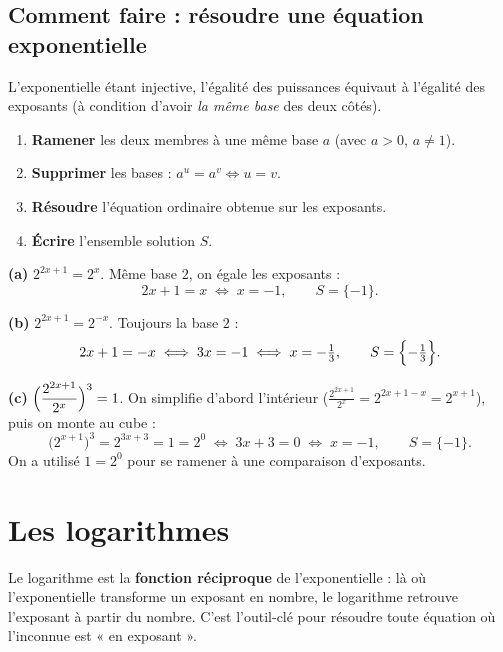 \documentclass[11pt,a4paper]{article}
\begin{document}
\subsection{Comment faire : résoudre une équation exponentielle}

\begin{commentfaire}[équation du type $a^{u(x)}=a^{v(x)}$]
L'exponentielle étant injective, l'égalité des puissances équivaut à l'égalité des exposants
(à condition d'avoir \emph{la même base} des deux côtés).
\begin{enumerate}[leftmargin=2em,topsep=2pt,itemsep=2pt]
  \item \textbf{Ramener} les deux membres à une même base $a$ (avec $a>0$, $a\neq 1$).
  \item \textbf{Supprimer} les bases : $a^{u}=a^{v}\Longleftrightarrow u=v$.
  \item \textbf{Résoudre} l'équation ordinaire obtenue sur les exposants.
  \item \textbf{Écrire} l'ensemble solution $S$.
\end{enumerate}
\end{commentfaire}

\begin{exemple}
\textbf{(a)} \;$2^{2x+1}=2^{x}$. Même base $2$, on égale les exposants :
\[ 2x+1=x \;\Longleftrightarrow\; x=-1, \qquad S=\{-1\}. \]

\medskip
\textbf{(b)} \;$2^{2x+1}=2^{-x}$. Toujours la base $2$ :
\[ 2x+1=-x \;\Longleftrightarrow\; 3x=-1 \;\Longleftrightarrow\; x=-\tfrac{1}{3}, \qquad S=\Bigl\{-\tfrac{1}{3}\Bigr\}. \]

\medskip
\textbf{(c)} \;$\displaystyle\Bigl(\frac{2^{2x+1}}{2^{x}}\Bigr)^{3}=1$. On simplifie d'abord l'intérieur
($\tfrac{2^{2x+1}}{2^{x}}=2^{2x+1-x}=2^{x+1}$), puis on monte au cube :
\[ \bigl(2^{x+1}\bigr)^{3}=2^{3x+3}=1=2^{0}
   \;\Longleftrightarrow\; 3x+3=0 \;\Longleftrightarrow\; x=-1,\qquad S=\{-1\}. \]
On a utilisé $1=2^{0}$ pour se ramener à une comparaison d'exposants.
\end{exemple}

\section{Les logarithmes}
Le logarithme est la \textbf{fonction réciproque} de l'exponentielle : là où l'exponentielle
transforme un exposant en nombre, le logarithme retrouve l'exposant à partir du nombre. C'est
l'outil-clé pour résoudre toute équation où l'inconnue est « en exposant ».
\end{document}
